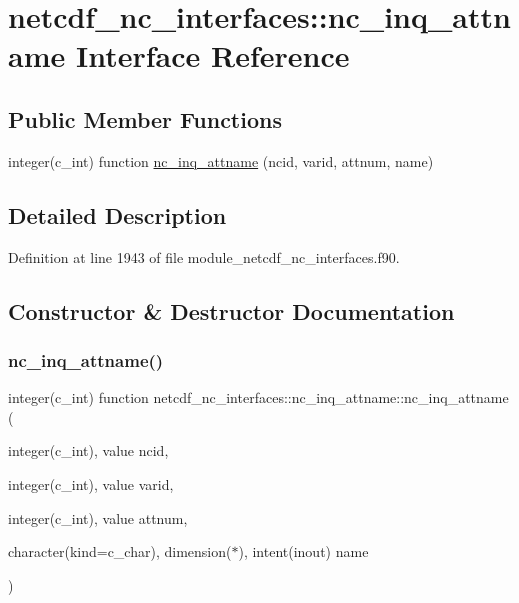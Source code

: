 \hypertarget{interfacenetcdf__nc__interfaces_1_1nc__inq__attname}{}\section{netcdf\+\_\+nc\+\_\+interfaces\+:\+:nc\+\_\+inq\+\_\+attname Interface Reference}
\label{interfacenetcdf__nc__interfaces_1_1nc__inq__attname}
\subsection*{Public Member Functions}
\begin{DoxyCompactItemize}
\item 
integer(c\+\_\+int) function \hyperlink{interfacenetcdf__nc__interfaces_1_1nc__inq__attname_aff71b808bfd8383df7f495d22a43ca37}{nc\+\_\+inq\+\_\+attname} (ncid, varid, attnum, name)
\end{DoxyCompactItemize}


\subsection{Detailed Description}


Definition at line 1943 of file module\+\_\+netcdf\+\_\+nc\+\_\+interfaces.\+f90.



\subsection{Constructor \& Destructor Documentation}
\mbox{\label{interfacenetcdf__nc__interfaces_1_1nc__inq__attname_aff71b808bfd8383df7f495d22a43ca37}} 
\subsubsection{\texorpdfstring{nc\+\_\+inq\+\_\+attname()}{nc\_inq\_attname()}}
{\footnotesize\ttfamily integer(c\+\_\+int) function netcdf\+\_\+nc\+\_\+interfaces\+::nc\+\_\+inq\+\_\+attname\+::nc\+\_\+inq\+\_\+attname (\begin{DoxyParamCaption}\item[{integer(c\+\_\+int), value}]{ncid,  }\item[{integer(c\+\_\+int), value}]{varid,  }\item[{integer(c\+\_\+int), value}]{attnum,  }\item[{character(kind=c\+\_\+char), dimension($\ast$), intent(inout)}]{name }\end{DoxyParamCaption})}



